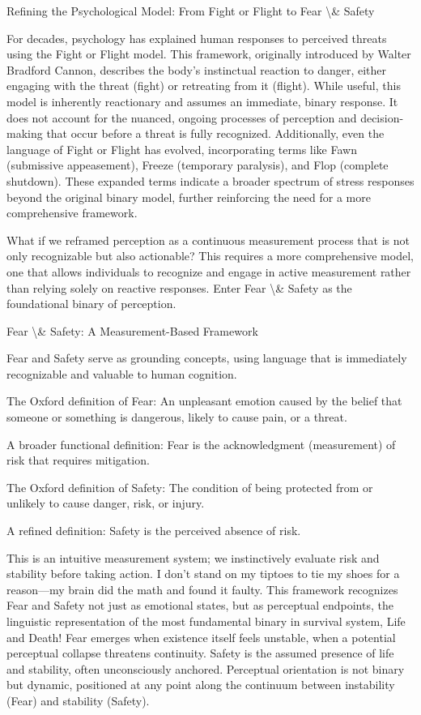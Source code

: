 \documentclass[12pt]{article}
\begin{document}
Refining the Psychological Model: From Fight or Flight to Fear \textbackslash{}& Safety

For decades, psychology has explained human responses to perceived threats using the Fight or Flight model. This framework, originally introduced by Walter Bradford Cannon, describes the body's instinctual reaction to danger, either engaging with the threat (fight) or retreating from it (flight). While useful, this model is inherently reactionary and assumes an immediate, binary response. It does not account for the nuanced, ongoing processes of perception and decision-making that occur before a threat is fully recognized. Additionally, even the language of Fight or Flight has evolved, incorporating terms like Fawn (submissive appeasement), Freeze (temporary paralysis), and Flop (complete shutdown). These expanded terms indicate a broader spectrum of stress responses beyond the original binary model, further reinforcing the need for a more comprehensive framework.

What if we reframed perception as a continuous measurement process that is not only recognizable but also actionable? This requires a more comprehensive model, one that allows individuals to recognize and engage in active measurement rather than relying solely on reactive responses. Enter Fear \textbackslash{}& Safety as the foundational binary of perception.

Fear \textbackslash{}& Safety: A Measurement-Based Framework

Fear and Safety serve as grounding concepts, using language that is immediately recognizable and valuable to human cognition.

The Oxford definition of Fear: An unpleasant emotion caused by the belief that someone or something is dangerous, likely to cause pain, or a threat.

A broader functional definition: Fear is the acknowledgment (measurement) of risk that requires mitigation.

The Oxford definition of Safety: The condition of being protected from or unlikely to cause danger, risk, or injury.

A refined definition: Safety is the perceived absence of risk.

This is an intuitive measurement system; we instinctively evaluate risk and stability before taking action. I don’t stand on my tiptoes to tie my shoes for a reason—my brain did the math and found it faulty. This framework recognizes Fear and Safety not just as emotional states, but as perceptual endpoints, the linguistic representation of the most fundamental binary in survival system, Life and Death! Fear emerges when existence itself feels unstable, when a potential perceptual collapse threatens continuity. Safety is the assumed presence of life and stability, often unconsciously anchored. Perceptual orientation is not binary but dynamic, positioned at any point along the continuum between instability (Fear) and stability (Safety).
\end{document}

